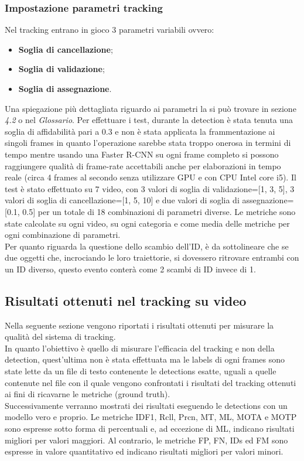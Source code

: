 \subsubsection{Impostazione parametri tracking}
Nel tracking entrano in gioco 3 parametri variabili ovvero:
\begin{itemize}
\item \textbf{Soglia di cancellazione};
\item \textbf{Soglia di validazione};
\item \textbf{Soglia di assegnazione}.
\end{itemize}
Una spiegazione più dettagliata riguardo ai parametri la si può trovare in sezione \textit{4.2} o nel \textit{Glossario}.
Per effettuare i test, durante la detection è stata tenuta una soglia di affidabilità pari a 0.3 e non è stata applicata la frammentazione ai singoli frames in quanto l'operazione sarebbe stata troppo onerosa in termini di tempo mentre usando una Faster R-CNN su ogni frame completo si possono raggiungere qualità di frame-rate accettabili anche per elaborazioni in tempo reale (circa 4 frames al secondo senza utilizzare GPU e con CPU Intel core i5).
Il test è stato effettuato su 7 video, con 3 valori di soglia di validazione=[1, 3, 5], 3 valori di soglia di cancellazione=[1, 5, 10] e due valori di soglia di assegnazione=[0.1, 0.5] per un totale di 18 combinazioni di parametri diverse. Le metriche sono state calcolate su ogni video, su ogni categoria e come media delle metriche per ogni combinazione di parametri.\\
Per quanto riguarda la questione dello scambio dell'ID, è da sottolineare che se due oggetti che, incrociando le loro traiettorie, si dovessero ritrovare entrambi con un ID diverso, questo evento conterà come 2 scambi di ID invece di 1.

\subsection{Risultati ottenuti nel tracking su video}
Nella seguente sezione vengono riportati i risultati ottenuti per misurare la qualità del sistema di tracking.\\
In quanto l'obiettivo è quello di misurare l'efficacia del tracking e non della detection, quest'ultima non è stata effettuata ma le labels di ogni frames sono state lette da un file di testo contenente le detections esatte, uguali a quelle contenute nel file con il quale vengono confrontati i risultati del tracking ottenuti ai fini di ricavarne le metriche (ground truth).\\
Successivamente verranno mostrati dei risultati eseguendo le detections con un modello vero e proprio. Le metriche IDF1, Rcll, Prcn, MT, ML, MOTA e MOTP sono espresse sotto forma di percentuali e, ad eccezione di ML, indicano risultati migliori per valori maggiori. Al contrario, le metriche FP, FN, IDs ed FM sono espresse in valore quantitativo ed indicano risultati migliori per valori minori.

